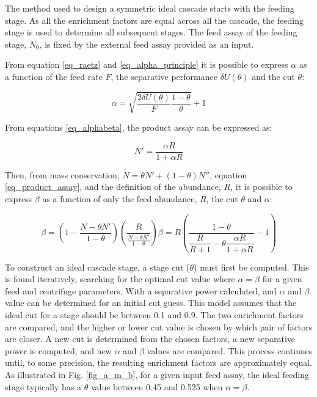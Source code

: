 The method used to design a symmetric ideal cascade starts with the feeding
stage. As all the enrichment factors are equal across all the cascade, the
feeding stage is used to determine all subsequent stages.
The feed assay of the feeding stage, $N_{0}$, is fixed by the external feed assay
provided as an input.

From equation \eqref{eq_raetz} and \eqref{eq_alpha_principle} it is possible to
express $\alpha$ as a function of the feed rate $F$, the separative performance
$\delta U(\theta)$ and the cut $\theta$:

\begin{equation} \label{eq_alpha}
    \alpha = \sqrt{\frac{2\delta U(\theta)}{F} \frac{1-\theta}{\theta}} + 1
\end{equation}


From equations \eqref{eq_alphabeta}, the product assay can be expressed as:

\begin{equation}\label{eq_product_assay}
    N' = \frac{\alpha R}{1 + \alpha R}
\end {equation}


Then, from mass conservation, $N = \theta N' + (1-\theta)N''$, equation
\eqref{eq_product_assay}, and the definition of the abundance, $R$, it is
possible to express $\beta$ as a function of only the feed abundance,
$R$, the cut $\theta$ and $\alpha$:

\begin{subequations}
    \begin{equation}\label{eq_beta_interim}
        \beta = \left( 1 - \frac{N - \theta N'}{1-\theta} \right)
                        \left( \frac{R}{\frac{N - \theta N'}{1 - \theta}} \right)
    \end{equation}
    \begin{equation}\label{eq_beta}
        \beta =   R \left(\dfrac{1-\theta}
                        {\dfrac{R}{R+1}- \theta \dfrac{\alpha R}{1+\alpha R}} -1\right)
    \end{equation}
\end{subequations}


To construct an ideal cascade stage, a stage cut ($\theta$) must first be computed.
This is found iteratively, searching for the optimal cut value where $\alpha = \beta$
for a given feed and centrifuge parameters. With a separative power calculated,
and $\alpha$ and $\beta$ value can be determined for an initial cut guess. This
model assumes that the ideal cut for a stage should be between 0.1 and 0.9. The
two enrichment factors are compared, and the higher or lower cut value is chosen
by which pair of factors are closer. A new cut is determined from the chosen
factors, a new separative power is computed, and new $\alpha$ and $\beta$ values
are compared. This process continues until, to some precision, the resulting
enrichment factors are approximately equal. As illustrated in Fig. \ref{fig_a_m_b},
for a given input feed assay, the ideal feeding stage typically has a $\theta$
value between 0.45 and 0.525 when $\alpha = \beta$.

